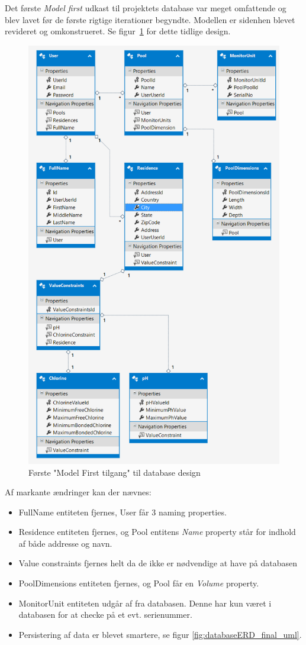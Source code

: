 Det første \textit{Model first} udkast til projektets database var meget omfattende og blev lavet før de første rigtige iterationer begyndte. Modellen er sidenhen blevet revideret og omkonstrueret. Se figur~\ref{fig:databaseERD_firstattempt_uml} for dette tidlige design.

\begin{figure}[H]
	\centering
	\includegraphics[width=0.8\linewidth]{figs/design/databaseERD}
	\caption{Første "Model First tilgang" til database design}
	\label{fig:databaseERD_firstattempt_uml}
\end{figure}

Af markante ændringer kan der nævnes:

\begin{itemize}
	\item FullName entiteten fjernes, User får 3 naming properties.
	\item Residence entiteten fjernes, og Pool entitens \textit{Name} property står for indhold af både addresse og navn.
	\item Value constraints fjernes helt da de ikke er nødvendige at have på databasen
	\item PoolDimensions entiteten fjernes, og Pool får en \textit{Volume} property.
	\item MonitorUnit entiteten udgår af fra databasen. Denne har kun været i databasen for at checke på et evt. serienummer.
	\item Persistering af data er blevet smartere, se figur \ref{fig:databaseERD_final_uml}.
\end{itemize}

